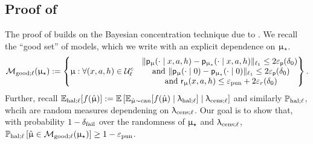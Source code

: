 

\subsection{Proof of  \label{sec:proof_hall_good_event}}
The proof of  builds on the Bayesian concentration technique due to \cite{Selke-PoIE-ec21}. We recall the ``good set'' of models, which we write with an explicit dependence on $\upmu_{\star}$.
\begin{align}
\mathcal{M}_{\mathrm{good};\ell}(\upmu_{\star}) := \left\{\upmu: \forall (x,a,h) \in \mathcal{U}_{\ell}^c \begin{matrix} &\|\mathsf{p}_{\upmu}(\cdot \mid x,a,h) - \mathsf{p}_{\upmu_{\star}}(\cdot \mid x,a,h)\|_{\ell_1} \le 2\varepsilon_{\mathsf{p}}(\delta_0) \\
&\text{ and }\|\mathsf{p}_{\upmu}(\cdot \mid 0) - \mathsf{p}_{\upmu_{\star}}(\cdot \mid 0) \|_{\ell_1} \le 2\varepsilon_{\mathsf{p}}(\delta_0)\\
&\text{ and }  \mathsf{r}_{\upmu}(x,a,h) \le \varepsilon_{\mathrm{pun}} + 2\varepsilon_{r}(\delta_0)\\\end{matrix} \right\}. \label{eq:modgoodl}
\end{align}
Further, recall $\Exphall[f(\modvarhat)] := \Expop\left[\Expmucan[f(\modvarhat) \mid \ledhall] \mid \ledcensl\right]$ and similarly $\operatorname{\mathbb{P}}_{\mathrm{hal};\ell}$, whcih are random measures dependening on $\uplambda_{\mathrm{cens};\ell}$. Our goal is to show that, with probability $1 - \delta_{\mathrm{fail}}$ over the randomness of $\upmu_{\star}$ and $\uplambda_{\mathrm{cens};\ell}$, $\operatorname{\mathbb{P}}_{\mathrm{hal};\ell}\left[ \hat{\upmu}\in \mathcal{M}_{\mathrm{good};\ell}(\upmu_{\star})\right]\ge 1 - \varepsilon_{\mathrm{pun}}$.

